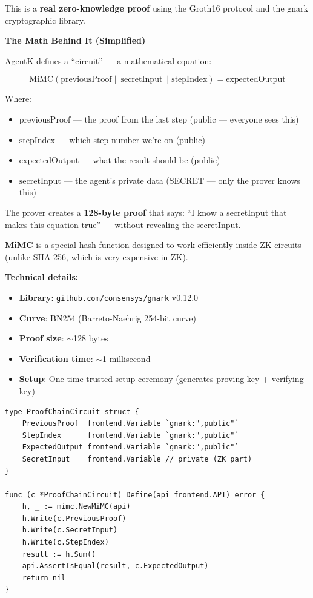 \documentclass[12pt,a4paper,openany]{report}
\begin{document}
This is a \textbf{real zero-knowledge proof} using the Groth16 protocol and the gnark cryptographic library.

\begin{keyconceptbox}
\textbf{The Math Behind It (Simplified)}

AgentK defines a ``circuit'' — a mathematical equation:

$$\text{MiMC}(\text{previousProof} \| \text{secretInput} \| \text{stepIndex}) = \text{expectedOutput}$$

Where:
\begin{itemize}
    \item $\text{previousProof}$ — the proof from the last step (public — everyone sees this)
    \item $\text{stepIndex}$ — which step number we're on (public)
    \item $\text{expectedOutput}$ — what the result should be (public)
    \item $\text{secretInput}$ — the agent's private data (SECRET — only the prover knows this)
\end{itemize}

The prover creates a \textbf{128-byte proof} that says: ``I know a secretInput that makes this equation true'' — without revealing the secretInput.
\end{keyconceptbox}

\textbf{MiMC} is a special hash function designed to work efficiently inside ZK circuits (unlike SHA-256, which is very expensive in ZK).

\textbf{Technical details:}
\begin{itemize}
    \item \textbf{Library}: \texttt{github.com/consensys/gnark} v0.12.0
    \item \textbf{Curve}: BN254 (Barreto-Naehrig 254-bit curve)
    \item \textbf{Proof size}: $\sim$128 bytes
    \item \textbf{Verification time}: $\sim$1 millisecond
    \item \textbf{Setup}: One-time trusted setup ceremony (generates proving key + verifying key)
\end{itemize}

\begin{lstlisting}[style=golang, caption={The actual circuit code (internal/verifiable/circuit.go)}]
type ProofChainCircuit struct {
    PreviousProof  frontend.Variable `gnark:",public"`
    StepIndex      frontend.Variable `gnark:",public"`
    ExpectedOutput frontend.Variable `gnark:",public"`
    SecretInput    frontend.Variable // private (ZK part)
}

func (c *ProofChainCircuit) Define(api frontend.API) error {
    h, _ := mimc.NewMiMC(api)
    h.Write(c.PreviousProof)
    h.Write(c.SecretInput)
    h.Write(c.StepIndex)
    result := h.Sum()
    api.AssertIsEqual(result, c.ExpectedOutput)
    return nil
}
\end{lstlisting}
\end{document}
